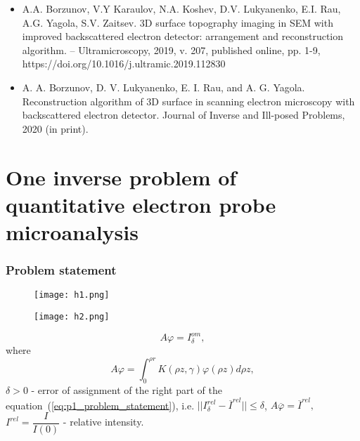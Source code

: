 \documentclass{beamer}
\begin{document}
\begin{frame}[c, allowframebreaks]
\begin{itemize}
        \item A.A. Borzunov, V.Y Karaulov, N.A. Koshev, D.V. Lukyanenko, E.I. Rau, A.G. Yagola, S.V. Zaitsev. 3D surface topography imaging in SEM with improved backscattered electron detector: arrangement and reconstruction algorithm. – Ultramicroscopy, 2019, v. 207, published online, pp. 1-9,  https://doi.org/10.1016/j.ultramic.2019.112830
        \item A. A. Borzunov, D. V. Lukyanenko, E. I. Rau, and A. G. Yagola. Reconstruction algorithm of 3D surface in scanning electron microscopy with backscattered electron detector. Journal of Inverse and Ill-posed Problems, 2020 (in print).
    \end{itemize}
\end{frame}

\section{One inverse problem of quantitative electron probe microanalysis}
\begin{frame}[c]
    \sectionpage
\end{frame}

\begin{frame}[c, allowframebreaks]
    \frametitle{Problem statement}
    \begin{figure}
        \texttt{[image: h1.png]}\label{fig:h1}
    \end{figure}

    \framebreak

    \begin{figure}
        \texttt{[image: h2.png]}\label{fig:h2}
    \end{figure}

    \framebreak

    \begin{equation}
        A \varphi = I_{\delta}^{om},
        \label{eq:p1_problem_statement}
    \end{equation}
    where
    $$ A\varphi = \int_0^{\rho r} K(\rho z, \gamma) \varphi(\rho z) d \rho z, $$
    $\delta > 0$ - error of assignment of the right part of the
    equation~(\ref{eq:p1_problem_statement}), i.e.
    $ || I_\delta^{rel} - \overline{I}^{rel} || \le \delta$,
    $A \overline{\varphi} = \overline{I}^{rel},$
    $I^{rel} = \dfrac{I}{I(0)}$ - relative intensity.
\end{frame}
\end{document}
